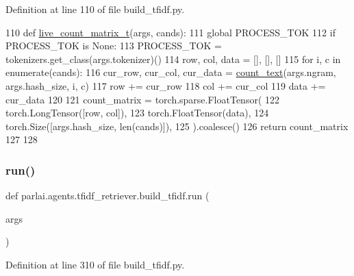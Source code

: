Definition at line 110 of file build\+\_\+tfidf.\+py.


\begin{DoxyCode}
110 \textcolor{keyword}{def }\hyperlink{namespaceparlai_1_1agents_1_1tfidf__retriever_1_1build__tfidf_af6a82e7b8a6efb75fb73be53b55a7787}{live\_count\_matrix\_t}(args, cands):
111     \textcolor{keyword}{global} PROCESS\_TOK
112     \textcolor{keywordflow}{if} PROCESS\_TOK \textcolor{keywordflow}{is} \textcolor{keywordtype}{None}:
113         PROCESS\_TOK = tokenizers.get\_class(args.tokenizer)()
114     row, col, data = [], [], []
115     \textcolor{keywordflow}{for} i, c \textcolor{keywordflow}{in} enumerate(cands):
116         cur\_row, cur\_col, cur\_data = \hyperlink{namespaceparlai_1_1agents_1_1tfidf__retriever_1_1build__tfidf_a76bae1c966a21d123cb91949d6c8ec20}{count\_text}(args.ngram, args.hash\_size, i, c)
117         row += cur\_row
118         col += cur\_col
119         data += cur\_data
120 
121     count\_matrix = torch.sparse.FloatTensor(
122         torch.LongTensor([row, col]),
123         torch.FloatTensor(data),
124         torch.Size([args.hash\_size, len(cands)]),
125     ).coalesce()
126     \textcolor{keywordflow}{return} count\_matrix
127 
128 
\end{DoxyCode}
\mbox{\label{namespaceparlai_1_1agents_1_1tfidf__retriever_1_1build__tfidf_a0d8cca9dbdf0fa23d25e81ec2a96b347}} 
\subsubsection{\texorpdfstring{run()}{run()}}
{\footnotesize\ttfamily def parlai.\+agents.\+tfidf\+\_\+retriever.\+build\+\_\+tfidf.\+run (\begin{DoxyParamCaption}\item[{}]{args }\end{DoxyParamCaption})}



Definition at line 310 of file build\+\_\+tfidf.\+py.


